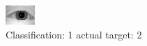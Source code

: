 \begin{figure}[h!]
\begin{center}
\includegraphics[width=0.60\columnwidth]{figures/ID872_class_1_target_2.png}
\end{center}
\caption{ Classification: 1 actual target: 2}
\label{fig:ID872_class_1_target_2}
\end{figure}
